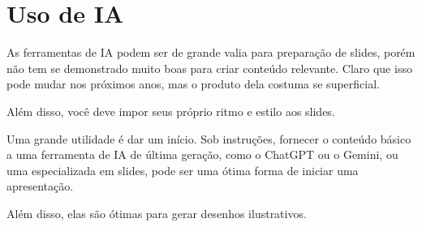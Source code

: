 \section{Uso de IA}

As ferramentas de IA podem ser de grande valia para preparação de slides, porém não tem se demonstrado muito boas para criar conteúdo relevante. Claro que isso pode mudar nos próximos anos, mas o produto dela costuma se superficial. 

Além disso, você deve impor seus próprio ritmo e estilo aos slides.

Uma grande utilidade é dar um início. Sob instruções, fornecer o conteúdo básico a uma ferramenta de IA de última geração, como o ChatGPT ou o Gemini, ou uma especializada em slides, pode ser uma ótima forma de iniciar uma apresentação.

Além disso, elas são ótimas para gerar desenhos ilustrativos. 




